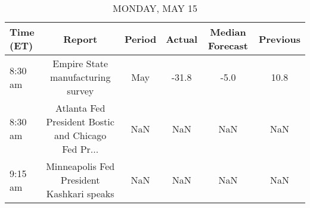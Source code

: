 \documentclass{article}%
\begin{document}
%
\normalsize%


\begin{table}[htbp]%
\caption{MONDAY, MAY 15}%
\centering%
\begin{adjustbox}{width=1\textwidth}%
\begin{tabular}{lccccc}
\toprule
Time (ET) &                                             Report & Period & Actual & Median Forecast & Previous \\
\midrule
  8:30 am &                  Empire State manufacturing survey &    May &  -31.8 &            -5.0 &     10.8 \\
  8:30 am & Atlanta Fed President Bostic and Chicago Fed Pr... &    NaN &    NaN &             NaN &      NaN \\
  9:15 am &          Minneapolis Fed President Kashkari speaks &    NaN &    NaN &             NaN &      NaN \\
\bottomrule
\end{tabular}
%
\end{adjustbox}%
\end{table}

%
\end{document}
